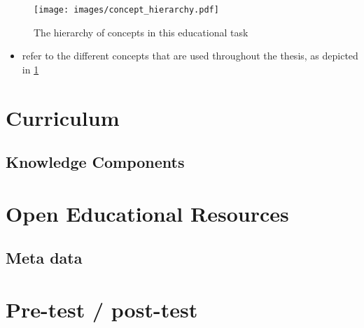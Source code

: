 \begin{figure}[ht!]
	\centering
	\texttt{[image: images/concept\_hierarchy.pdf]}
	\caption[Concept hierarchy]{The hierarchy of concepts in this educational
	task}
	\label{fig:concept_hierarchy}
\end{figure}
\begin{itemize}
	\item refer to the different concepts that are used throughout the thesis,
		as depicted in \ref{fig:concept_hierarchy}
\end{itemize}
\section{Curriculum}
\subsection{Knowledge Components}
\section{Open Educational Resources}
\subsection{Meta data}
\section{Pre-test / post-test} %
